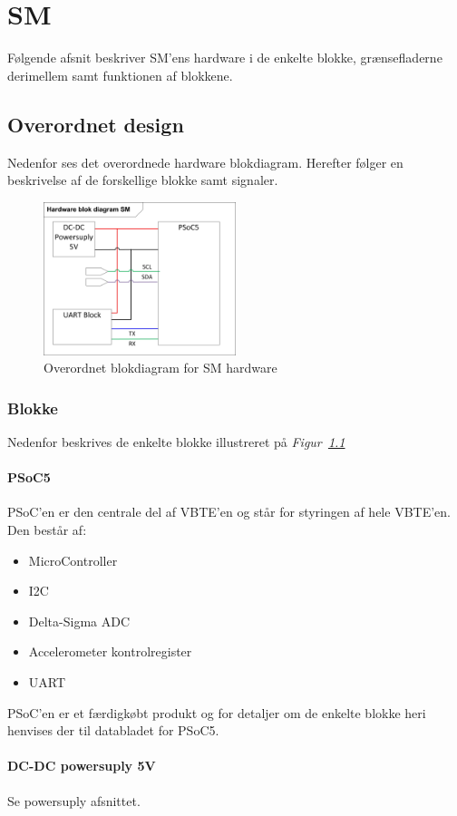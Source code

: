 \chapter{SM}
Følgende afsnit beskriver SM'ens hardware i de enkelte blokke, grænsefladerne derimellem samt funktionen af blokkene.

\section{Overordnet design}
Nedenfor ses det overordnede hardware blokdiagram. Herefter følger en beskrivelse af de forskellige blokke samt signaler.
\begin{figure}[H]
\centering
\includegraphics[width=0.5\textwidth]{billeder/SMHardware}
\caption{Overordnet blokdiagram for SM hardware}
\label{fig:HWSM}
\end{figure}
\subsection{Blokke}
Nedenfor beskrives de enkelte blokke illustreret på \textit{Figur~\ref{fig:HWSM}}
\subsubsection{PSoC5}
PSoC'en er den centrale del af VBTE'en og står for styringen af hele VBTE'en. Den består af:
\begin{itemize}
\item MicroController
\item I2C
\item Delta-Sigma ADC
\item Accelerometer kontrolregister
\item UART
\end{itemize}
PSoC'en er et færdigkøbt produkt og for detaljer om de enkelte blokke heri henvises der til databladet for PSoC5.
\subsubsection{DC-DC powersuply 5V}
Se powersuply afsnittet.
